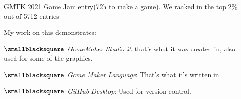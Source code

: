 \documentclass[10mm,letterpaper,notitlepage]{article}
\begin{document}
			\setlength{\parindent}{\parindent-4mm}
			{\color[RGB]{108, 29, 169}
			\fontsize{4.5mm}{6.0mm}\selectfont
				\setlength{\parindent}{\parindent+4mm}
				
				\nopagebreak
						{\color[RGB]{87, 135, 199}
						\fontsize{9.0mm}{12.0mm}\selectfont
						\par}
					\setlength{\parindent}{\parindent+4mm}
					
					\nopagebreak
							{\color[RGB]{0, 0, 0}
							\fontsize{2.25mm}{3.0mm}\selectfont
									{\color[RGB]{108, 29, 169}
									\fontsize{4.5mm}{6.0mm}\selectfont
									\color[RGB]{105, 58, 174}{{ }}
									\par}
							\nopagebreak
							GMTK 2021 Game Jam entry(72h to make a game). We ranked in the top 2\% out of 5712 entries.
							
							\nopagebreak
							My work on this demonstrates:
								\setlength{\parindent}{\parindent+4mm}
								
								\nopagebreak
								$\smallblacksquare$ \textit{GameMaker Studio 2}: that's what it was created in, also used for some of the graphics.
								
								$\smallblacksquare$ \textit{Game Maker Language}: That's what it's written in.
								
								$\smallblacksquare$ \textit{GitHub Desktop}: Used for version control.
								
}}
\end{document}
